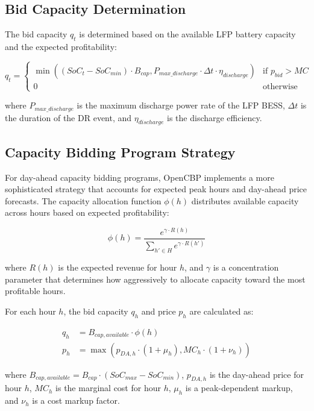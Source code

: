 \documentclass[11pt,a4paper]{article}
\begin{document}
\subsection{Bid Capacity Determination}
The bid capacity $q_t$ is determined based on the available LFP battery capacity and the expected profitability:

\begin{equation}
q_t = \begin{cases}
\min((SoC_t - SoC_{min}) \cdot B_{cap}, P_{max\_discharge} \cdot \Delta t \cdot \eta_{discharge}) & \text{if } p_{bid} > MC \\
0 & \text{otherwise}
\end{cases}
\end{equation}

where $P_{max\_discharge}$ is the maximum discharge power rate of the LFP BESS, $\Delta t$ is the duration of the DR event, and $\eta_{discharge}$ is the discharge efficiency.

\subsection{Capacity Bidding Program Strategy}
For day-ahead capacity bidding programs, OpenCBP implements a more sophisticated strategy that accounts for expected peak hours and day-ahead price forecasts. The capacity allocation function $\phi(h)$ distributes available capacity across hours based on expected profitability:

\begin{equation}
\phi(h) = \frac{e^{\gamma \cdot R(h)}}{\sum_{h' \in H} e^{\gamma \cdot R(h')}}
\end{equation}

where $R(h)$ is the expected revenue for hour $h$, and $\gamma$ is a concentration parameter that determines how aggressively to allocate capacity toward the most profitable hours.

For each hour $h$, the bid capacity $q_h$ and price $p_h$ are calculated as:

\begin{align}
q_h &= B_{cap,available} \cdot \phi(h) \\
p_h &= \max(p_{DA,h} \cdot (1 + \mu_h), MC_h \cdot (1 + \nu_h))
\end{align}

where $B_{cap,available} = B_{cap} \cdot (SoC_{max} - SoC_{min})$, $p_{DA,h}$ is the day-ahead price for hour $h$, $MC_h$ is the marginal cost for hour $h$, $\mu_h$ is a peak-dependent markup, and $\nu_h$ is a cost markup factor.
\end{document}
